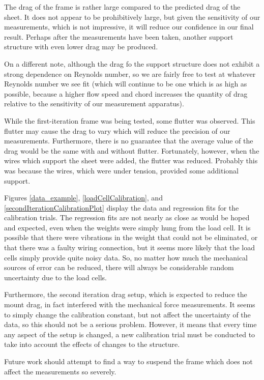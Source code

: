 \documentclass[12pt]{report} %
\begin{document}
The drag of the frame is rather large compared to the predicted drag of the sheet. It does not appear to be prohibitively large, but
given the sensitivity of our measurements, which is not impressive, it will reduce our confidence in our final result. Perhaps after
the measurements have been taken, another support structure with even lower drag may be produced.

On a different note, although the drag fo the support structure does not exhibit a strong dependence on Reynolds number, so we are
fairly free to test at whatever Reynolds number we see fit (which will continue to be one which is as high as possible,
because a higher flow speed and chord increases the quantity of drag relative to the sensitivity of our measurement apparatus).

While the first-iteration frame was being tested, some flutter was observed. This flutter may cause the drag to vary which will reduce the precision
of our measurements. Furthermore, there is no guarantee that the average value of the drag would be the same with and without flutter.
Fortunately, however, when the wires which support the sheet were added, the flutter was reduced. Probably this was because the wires,
which were under tension, provided some additional support.

Figures \ref{data_example}, \ref{loadCellCalibration}, and \ref{secondIterationCalibrationPlot} display the data and regression fits for
the calibration trials. The regression fits are not nearly as close as would be hoped and expected, even when the weights were simply hung from
the load cell. It is possible that there were vibrations in the weight that could not be eliminated, or that there was a faulty wiring connection,
but it seems more likely that the load cells simply provide quite noisy data. So, no matter how much the mechanical sources of error can be reduced,
there will always be considerable random uncertainty due to the load cells.

Furthermore, the second iteration drag setup, which is expected to reduce the mount drag, in fact interfered with the mechanical force measurements.
It seems to simply change the calibration constant, but not affect the uncertainty of the data, so this should not be a serious problem. However,
it means that every time any aspect of the setup is changed, a new calibration trial must be conducted to take into account the effects of changes
to the structure.

Future work should attempt to find a way to suspend the frame which does not affect the measurements so severely.
\end{document}
